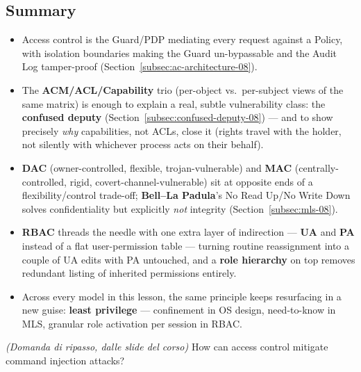 \documentclass[12pt, a4paper]{article}
\newcounter{esercizio}[section]
\begin{document}
\subsection{Summary}
\begin{itemize}
    \item Access control is the Guard/PDP mediating every request against a Policy, with isolation boundaries making the Guard un-bypassable and the Audit Log tamper-proof (Section~\ref{subsec:ac-architecture-08}).
    \item The \textbf{ACM/ACL/Capability} trio (per-object vs.\ per-subject views of the same matrix) is enough to explain a real, subtle vulnerability class: the \textbf{confused deputy} (Section~\ref{subsec:confused-deputy-08}) --- and to show precisely \emph{why} capabilities, not ACLs, close it (rights travel with the holder, not silently with whichever process acts on their behalf).
    \item \textbf{DAC} (owner-controlled, flexible, trojan-vulnerable) and \textbf{MAC} (centrally-controlled, rigid, covert-channel-vulnerable) sit at opposite ends of a flexibility/control trade-off; \textbf{Bell--La Padula}'s No Read Up/No Write Down solves confidentiality but explicitly \emph{not} integrity (Section~\ref{subsec:mls-08}).
    \item \textbf{RBAC} threads the needle with one extra layer of indirection --- \textbf{UA} and \textbf{PA} instead of a flat user-permission table --- turning routine reassignment into a couple of UA edits with PA untouched, and a \textbf{role hierarchy} on top removes redundant listing of inherited permissions entirely.
    \item Across every model in this lesson, the same principle keeps resurfacing in a new guise: \textbf{least privilege} --- confinement in OS design, need-to-know in MLS, granular role activation per session in RBAC.
\end{itemize}

\begin{tcolorbox}[colback=lightergray!10, colframe=tocsec, title=\textbf{Esercizio \theesercizio}]
\textit{(Domanda di ripasso, dalle slide del corso)} How can access control mitigate command injection attacks?
\end{tcolorbox}
\end{document}
